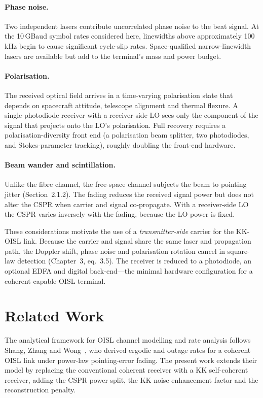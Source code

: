 \paragraph{Phase noise.} Two independent lasers contribute uncorrelated phase noise to the beat signal. At the 10\,GBaud symbol rates considered here, linewidths above approximately 100\,kHz begin to cause significant cycle-slip rates. Space-qualified narrow-linewidth lasers are available but add to the terminal's mass and power budget.

\paragraph{Polarisation.} The received optical field arrives in a time-varying polarisation state that depends on spacecraft attitude, telescope alignment and thermal flexure. A single-photodiode receiver with a receiver-side LO sees only the component of the signal that projects onto the LO's polarisation. Full recovery requires a polarisation-diversity front end (a polarisation beam splitter, two photodiodes, and Stokes-parameter tracking), roughly doubling the front-end hardware.

\paragraph{Beam wander and scintillation.} Unlike the fibre channel, the free-space channel subjects the beam to pointing jitter (Section~2.1.2). The fading reduces the received signal power but does not alter the CSPR when carrier and signal co-propagate. With a receiver-side LO the CSPR varies inversely with the fading, because the LO power is fixed.

These considerations motivate the use of a \emph{transmitter-side} carrier for the KK-OISL link. Because the carrier and signal share the same laser and propagation path, the Doppler shift, phase noise and polarisation rotation cancel in square-law detection (Chapter~3, eq.~3.5). The receiver is reduced to a photodiode, an optional EDFA and digital back-end---the minimal hardware configuration for a coherent-capable OISL terminal.

\section{Related Work}

The analytical framework for OISL channel modelling and rate analysis follows Shang, Zhang and Wong~\cite{shang2025}, who derived ergodic and outage rates for a coherent OISL link under power-law pointing-error fading. The present work extends their model by replacing the conventional coherent receiver with a KK self-coherent receiver, adding the CSPR power split, the KK noise enhancement factor and the reconstruction penalty.


